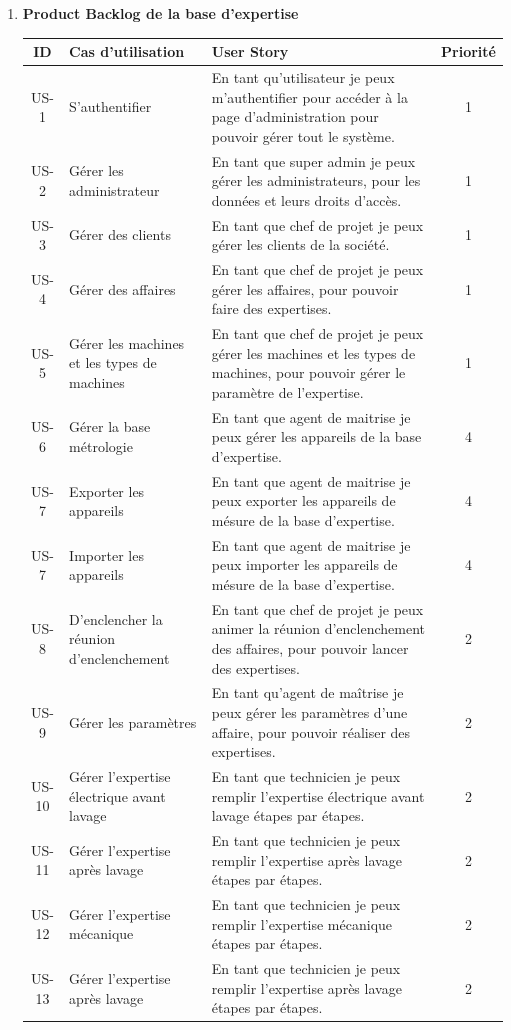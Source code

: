 \documentclass[11pt,a4paper]{article}
\begin{document}
\begin{enumerate}
\item \textbf{Product Backlog de la base d'expertise}


\begin{table}[H]
\centering
\begin{tabular}{|c|p{5cm}|p{8cm}|c|}
\hline
\textbf{ID} & \textbf{Cas d'utilisation} & \textbf{User Story} & \textbf{Priorité} \\
\hline
US-1 & S’authentifier & En tant qu’utilisateur je peux m’authentifier pour accéder à la page d’administration pour pouvoir gérer tout le système. & 1 \\
\hline
US-2 & Gérer les administrateur & En tant que super admin je peux gérer les administrateurs, pour les données et leurs droits d’accès. & 1 \\
\hline
US-3 & Gérer des clients & En tant que chef de projet je peux gérer les clients de la société. & 1 \\
\hline
US-4 & Gérer des affaires & En tant que chef de projet je peux gérer les affaires, pour pouvoir faire des expertises. & 1 \\
\hline
US-5 & Gérer les machines et les types de machines & En tant que chef de projet je peux gérer les machines et les types de machines, pour pouvoir gérer le paramètre de l’expertise. & 1 \\
\hline
US-6 & Gérer la base métrologie & En tant que agent de maitrise je peux gérer les appareils de la base d'expertise. & 4 \\
\hline
US-7 & Exporter les appareils & En tant que agent de maitrise je peux exporter les appareils de mésure de la base d'expertise. & 4 \\
\hline
US-7 & Importer les appareils & En tant que agent de maitrise je peux importer les appareils de mésure de la base d'expertise. & 4 \\
\hline

US-8 & D’enclencher la réunion d’enclenchement & En tant que chef de projet je peux animer la réunion d’enclenchement des affaires, pour pouvoir lancer des expertises. & 2 \\
\hline
US-9 & Gérer les paramètres & En tant qu’agent de maîtrise je peux gérer les paramètres d’une affaire, pour pouvoir réaliser des expertises. & 2 \\
\hline
US-10 & Gérer l'expertise électrique avant lavage & En tant que technicien je peux remplir l’expertise électrique avant lavage étapes par étapes. & 2 \\
\hline
US-11 & Gérer l'expertise après lavage & En tant que technicien je peux remplir l’expertise après lavage étapes par étapes. & 2 \\
\hline
US-12 & Gérer l'expertise mécanique & En tant que technicien je peux remplir l’expertise mécanique étapes par étapes. & 2 \\
\hline
US-13 & Gérer l'expertise après lavage & En tant que technicien je peux remplir l’expertise après lavage étapes par étapes. & 2 \\
\hline


\end{tabular}
\end{table}
\end{enumerate}
\end{document}
